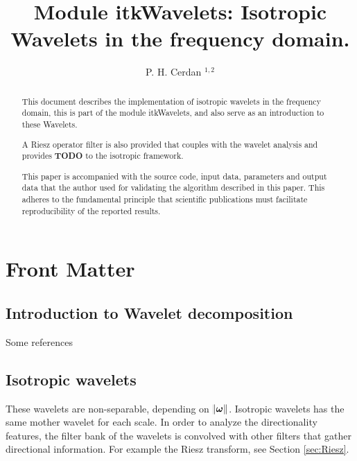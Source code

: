 \documentclass{InsightArticle}
\title{Module itkWavelets: Isotropic Wavelets in the frequency domain.}
\author{P. H. Cerdan $^{1,2}$}
\newcommand{\IJhandlerIDnumber}{3558}
\begin{document}
%
%
\IJhandlefooter{\IJhandlerIDnumber}


\ifpdf
\else
\fi


\maketitle


\ifhtml
\chapter*{Front Matter\label{front}}
\fi

\begin{abstract}
\noindent
This document describes the implementation of isotropic wavelets in the frequency domain, this is part of the module itkWavelets,
and also serve as an introduction to these Wavelets.

A Riesz operator filter is also provided that couples with the wavelet analysis and provides \textbf{TODO} to the isotropic framework.

This paper is accompanied with the source code, input data, parameters and
output data that the author used for validating the algorithm described in
this paper. This adheres to the fundamental principle that scientific
publications must facilitate reproducibility of the reported results.

\end{abstract}

\IJhandlenote{\IJhandlerIDnumber}

\tableofcontents

\section{Introduction to Wavelet decomposition}
\label{sec:Intro}
Some references
\section{Isotropic wavelets}
\label{sub:Isotropic}
These wavelets are non-separable, depending on $\norm{\bm{\omega}}$. Isotropic wavelets has the same mother wavelet for each scale. In order to analyze the directionality features, the filter bank of the wavelets is convolved with other filters that gather directional information. For example the Riesz transform, see Section \ref{sec:Riesz}.
\end{document}
